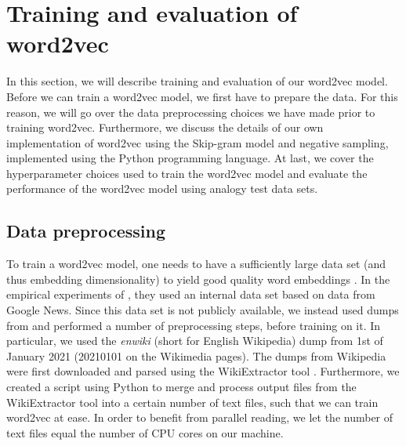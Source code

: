 \section{Training and evaluation of word2vec}
\label{sec:training-and-eval-our-word2vec-impl}
In this section, we will describe training and evaluation of our word2vec model. Before we can train a word2vec model, we first have to prepare the data. For this reason, we will go over the data preprocessing choices we have made prior to training word2vec. Furthermore, we discuss the details of our own implementation of word2vec using the Skip-gram model and negative sampling, implemented using the Python programming language. At last, we cover the hyperparameter choices used to train the word2vec model and evaluate the performance of the word2vec model using analogy test data sets.

\subsection{Data preprocessing}
\label{sec:word2vec-data-preprocessing}
To train a word2vec model, one needs to have a sufficiently large data set (and thus embedding dimensionality) to yield good quality word embeddings \cite{mikolov2013b}. In the empirical experiments of \cite{mikolov2013b}, they used an internal data set based on data from Google News. Since this data set is not publicly available, we instead used dumps from \cite{WikimediaDumps} and performed a number of preprocessing steps, before training on it. In particular, we used the \textit{enwiki} (short for English Wikipedia) dump from 1st of January 2021 (20210101 on the Wikimedia pages). The dumps from Wikipedia were first downloaded and parsed using the WikiExtractor tool \cite{Wikiextractor2015}. Furthermore, we created a script using Python to merge and process output files from the WikiExtractor tool into a certain number of text files, such that we can train word2vec at ease. In order to benefit from parallel reading, we let the number of text files equal the number of CPU cores on our machine.

